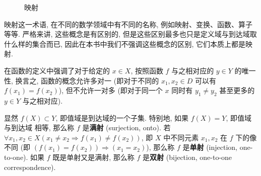 \documentclass[10pt,UTF8]{book} %
\begin{document}
\begin{figure}[H]

      \caption{映射}
\end{figure}

映射这一术语, 在不同的数学领域中有不同的名称, 例如映射、变换、函数、算子等等.
严格来讲, 这些概念是有区别的, 但是这些区别最多也只是定义域与到达域取什么样的集合而已,
因此在本书中我们不强调这些概念的区别, 它们本质上都是映射.

在函数的定义中强调了对于给定的 $x \in X$, 按照函数 $f$ 与之相对应的 $y \in Y$
的唯一性, 换言之, 函数的概念允许多对一 (即对于不同的 $x_1,x_2 \in D$ 
可以有 $f(x_1) = f(x_2)$), 但不允许一对多 (即对于同一个 $x$ 同时有 $y_1 \ne y_2$
甚至更多的 $y \in Y$ 与之相对应).

显然 $f(X) \subset Y$, 即值域是到达域的一个子集. 特别地, 如果 $f(X) = Y$, 即值域与到达域
相等, 那么称 $f$ 是\textbf{满射} (surjection, onto). 
若 $\forall x_1,x_2 \in X \left( x_1 \ne x_2 \Longrightarrow
f(x_1) \ne f(x_2) \right)$, 即 $X$ 中不同元素 $x_1,x_2$ 在 $f$ 下的像不同
(即 $(f(x_1) = f(x_2)) \Longrightarrow (x_1 = x_2)$), 那么称 $f$ 是\textbf{单射} (injection, one-to-one).
如果 $f$ 既是单射又是满射, 那么称 $f$ 是\textbf{双射} (bijection, one-to-one correspondence).
\end{document}
